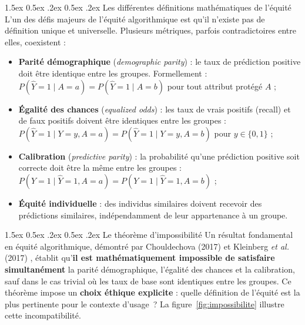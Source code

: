 \documentclass[12pt,a4paper]{article}
\makeatletter
\renewcommand\paragraph{\@startsection{paragraph}{4}{\z@}%
  {1.5ex \@plus 0.5ex \@minus .2ex}%
  {0.5ex \@plus .2ex}%
  {\normalfont\normalsize\bfseries}}
\makeatother
\begin{document}
\paragraph{Les différentes définitions mathématiques de l'équité}
L'un des défis majeurs de l'équité algorithmique est qu'il n'existe pas de définition unique et universelle. Plusieurs métriques, parfois contradictoires entre elles, coexistent :
\begin{itemize}
    \item \textbf{Parité démographique} (\textit{demographic parity}) : le taux de prédiction positive doit être identique entre les groupes. Formellement : $P(\hat{Y}=1 \mid A=a) = P(\hat{Y}=1 \mid A=b)$ pour tout attribut protégé $A$ ;
    \item \textbf{Égalité des chances} (\textit{equalized odds}) : les taux de vrais positifs (recall) et de faux positifs doivent être identiques entre les groupes : $P(\hat{Y}=1 \mid Y=y, A=a) = P(\hat{Y}=1 \mid Y=y, A=b)$ pour $y \in \{0,1\}$ ;
    \item \textbf{Calibration} (\textit{predictive parity}) : la probabilité qu'une prédiction positive soit correcte doit être la même entre les groupes : $P(Y=1 \mid \hat{Y}=1, A=a) = P(Y=1 \mid \hat{Y}=1, A=b)$ ;
    \item \textbf{Équité individuelle} : des individus similaires doivent recevoir des prédictions similaires, indépendamment de leur appartenance à un groupe.
\end{itemize}

\paragraph{Le théorème d'impossibilité}
Un résultat fondamental en équité algorithmique, démontré par Chouldechova (2017) \cite{chouldechova_2017} et Kleinberg \textit{et al.} (2017) \cite{kleinberg_2016}, établit qu'\textbf{il est mathématiquement impossible de satisfaire simultanément} la parité démographique, l'égalité des chances et la calibration, sauf dans le cas trivial où les taux de base sont identiques entre les groupes. Ce théorème impose un \textbf{choix éthique explicite} : quelle définition de l'équité est la plus pertinente pour le contexte d'usage~? La figure~\ref{fig:impossibilite} illustre cette incompatibilité.
\end{document}
